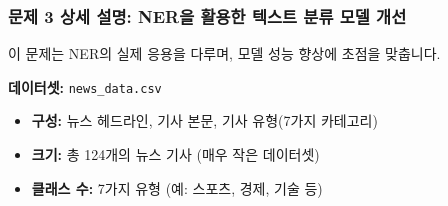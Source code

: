 \documentclass[11pt,a4paper]{article}
\begin{document}
\subsubsection*{문제 3 상세 설명: NER을 활용한 텍스트 분류 모델 개선}
이 문제는 NER의 실제 응용을 다루며, 모델 성능 향상에 초점을 맞춥니다.

\textbf{데이터셋:} \texttt{news\_data.csv}
\begin{itemize}
    \item \textbf{구성:} 뉴스 헤드라인, 기사 본문, 기사 유형(7가지 카테고리)
    \item \textbf{크기:} 총 124개의 뉴스 기사 (매우 작은 데이터셋)
    \item \textbf{클래스 수:} 7가지 유형 (예: 스포츠, 경제, 기술 등)
\end{itemize}
\end{document}
